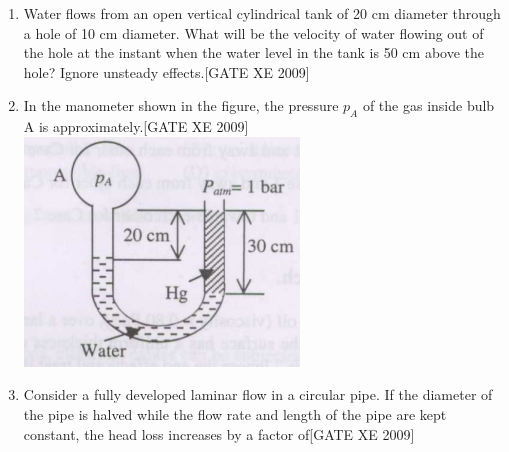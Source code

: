 \documentclass[journal,12pt,onecolumn]{IEEEtran}
\theoremstyle{remark}
\begin{document}
\begin{enumerate}
\item Water flows from an open vertical cylindrical tank of 20 cm diameter through a hole of 10 cm diameter. What will be the velocity of water flowing out of the hole at the instant when the water level in the tank is 50 cm above the hole? Ignore unsteady effects.\hfill[GATE XE 2009]\\
\begin{enumerate}
\end{enumerate}





\item In the manometer shown in the figure, the pressure $p_A$ of the gas inside bulb A is approximately.\hfill[GATE XE 2009]\\

\includegraphics[width=0.5\columnwidth]{figs/fig3.png}
\begin{enumerate}
\end{enumerate}



\item Consider a fully developed laminar flow in a circular pipe. If the diameter of the pipe is halved while the flow rate and length of the pipe are kept constant, the head loss increases by a factor of\hfill[GATE XE 2009]

\begin{enumerate}
\end{enumerate}




\end{enumerate}
\end{document}
